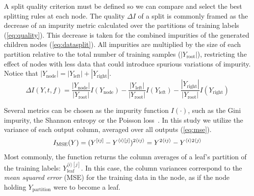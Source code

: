 A split quality criterion must be defined so we can compare and select the best splitting rules at each node. The quality $\Delta I$ of a split is commonly framed as the decrease of an impurity metric calculated over the partitions of training labels (\autoref{eq:quality}). This decrease is taken for the combined impurities of the generated children nodes (\autoref{eq:datasplit}).
All impurities are multiplied by the size of each partition relative to the total number of training samples ($|Y_\text{root}|$), restricting the effect of nodes with less data that could introduce spurious variations of impurity. Notice that $|Y_\text{node}|=|Y_\text{left}|+|Y_\text{right}|$.
%
\begin{equation}
    \Delta I(Y, t, f) =
        \frac{|Y_\text{node}|}{|Y_\text{root}|} I(Y_\text{node})
        - \frac{|Y_\text{left}|}{|Y_\text{root}|} I(Y_\text{left})
        - \frac{|Y_\text{right}|}{|Y_\text{root}|} I(Y_\text{right})
    \label{eq:quality}
\end{equation}

Several metrics can be chosen as the impurity function $I(\cdot)$, such as the Gini impurity, the Shannon entropy or the Poisson loss~\cite{breiman1984classification}.  %
In this study we utilize the variance of each output column, averaged over all outputs (\autoref{eq:mse}). 
%
%
\begin{equation}
    I_\text{MSE}(Y)
        = (Y^{[ij]} - Y^{\langle i\rangle[j]})^{2\langle ij\rangle}
        = Y^{2\langle ij\rangle} - Y^{\langle i\rangle 2\langle j\rangle}
    \label{eq:mse}
\end{equation}
%
Most commonly, the  function returns the column averages of a leaf's partition of the training labels: $Y_\text{leaf}^{\langle i\rangle[j]}$.
In this case, the column variances correspond to the \emph{mean squared error} (MSE) for the training data in the node, as if the node holding $Y_\text{partition}$ were to become a leaf.
%
%

